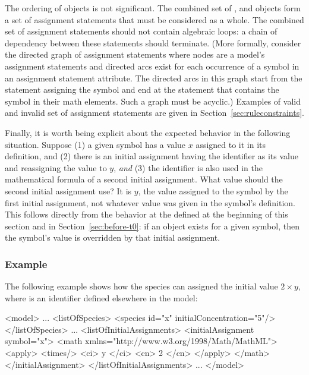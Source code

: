The ordering of \InitialAssignment objects is not significant.
The combined set of \InitialAssignment, \AssignmentRule and
\KineticLaw objects form a set of assignment statements that must
be considered as a whole.  The combined set of assignment
statements should not contain algebraic loops: a chain of
dependency between these statements should terminate.  (More
formally, consider the directed graph of assignment statements
where nodes are a model's assignment statements and directed arcs
exist for each occurrence of a symbol in an assignment statement
 attribute.  The directed arcs in this graph start from
the statement assigning the symbol and end at the statement that
contains the symbol in their math elements.  Such a graph must be
acyclic.) Examples of valid and invalid set of assignment
statements are given in Section~\ref{sec:ruleconstraints}.

Finally, it is worth being explicit about the expected behavior in
the following situation.  Suppose (1) a given symbol has a value
$x$ assigned to it in its definition, and (2) there is an initial
assignment having the identifier as its  value and
reassigning the value to $y$, \emph{and} (3) the identifier is
also used in the mathematical formula of a second initial
assignment.  What value should the second initial assignment use?
It is $y$, the value assigned to the symbol by the first initial
assignment, not whatever value was given in the symbol's
definition.  This follows directly from the behavior at the
defined at the beginning of this section and in
Section~\ref{sec:before-t0}: if an \InitialAssignment object
exists for a given symbol, then the symbol's value is overridden
by that initial assignment.


\subsubsection{Example}

The following example shows how the species  can assigned
the initial value $2 \times y$, where  is an identifier
defined elsewhere in the model:

\begin{example}

<model>
    ...
    <listOfSpecies>
        <species id="x" initialConcentration="5"/>
    </listOfSpecies>
    ...
    <listOfInitialAssignments>
        <initialAssignment symbol="x">
            <math xmlns="http://www.w3.org/1998/Math/MathML">
                <apply>
                    <times/> 
                    <ci> y </ci> 
                    <cn> 2 </cn>
                </apply>
            </math>
        </initialAssignment>
    </listOfInitialAssignments>
    ...
</model>
\end{example}

